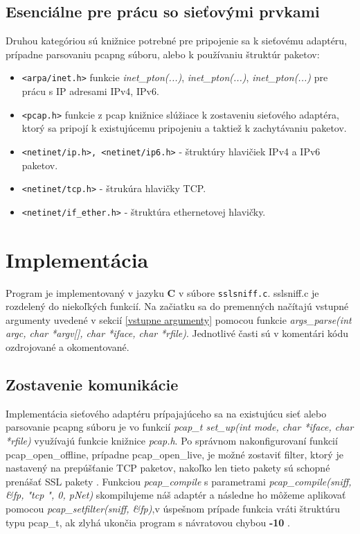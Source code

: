 \documentclass[11pt, a4paper]{article}
\begin{document}
	\subsection{Esenciálne pre prácu so sieťovými prvkami}
	Druhou kategóriou sú knižnice potrebné pre pripojenie sa k sieťovému adaptéru, prípadne parsovaniu pcapng súboru, alebo k používaniu štruktúr paketov:
	\begin{itemize}
	\item \texttt{<arpa/inet.h>} funkcie \emph{inet\_pton(...)}, \emph{inet\_pton(...)}, \emph{inet\_pton(...)} pre prácu s IP adresami IPv4, IPv6.
	\item \texttt{<pcap.h>} funkcie z pcap knižnice slúžiace k zostaveniu sieťového adaptéra, ktorý sa pripojí k existujúcemu pripojeniu a taktiež k zachytávaniu paketov.
	\item \texttt{<netinet/ip.h>, <netinet/ip6.h>} - štruktúry hlavičiek IPv4 a IPv6 paketov.
	\item \texttt{<netinet/tcp.h>} - štrukúra hlavičky TCP.
	\item \texttt{<netinet/if\_ether.h>} - štruktúra ethernetovej hlavičky.
	\end{itemize}

	
	
	\newpage
	\section{Implementácia}
	Program je implementovaný v jazyku \textbf{C} v súbore \texttt{sslsniff.c}.  
	sslsniff.c je rozdelený do niekoľkých funkcií. Na začiatku sa do premenných načítajú vstupné argumenty uvedené v sekcií \ref{vstupne argumenty} pomocou funkcie \emph{args\_parse(int argc, char *argv[], char *iface, char *rfile)}. 
Jednotlivé časti sú v komentári kódu ozdrojované a okomentované.
	
	\subsection{Zostavenie komunikácie}
	Implementácia sieťového adaptéru prípajajúceho sa na existujúcu sieť alebo parsovanie pcapng súboru je vo funkcií  \emph{pcap\_t set\_up(int mode, char *iface, char *rfile)} využívajú funkcie knižnice \emph{pcap.h}. Po správnom nakonfigurovaní funkcií pcap\_open\_offline, prípadne pcap\_open\_live, je možné zostaviť filter, ktorý je nastavený na prepúšťanie TCP paketov, nakoľko len tieto pakety sú schopné prenášať SSL pakety \cite{prednaskaZabezpeceni}. Funkciou \emph{pcap\_compile} s parametrami \emph{pcap\_compile(sniff, \&fp, "tcp ", 0, pNet)} skompilujeme náš adaptér a následne ho môžeme aplikovať pomocou \emph{pcap\_setfilter(sniff, \&fp)},v úspešnom prípade funkcia vráti štruktúru typu pcap\_t,  ak zlyhá ukončia program s návratovou chybou \textbf{-10} \cite{Tcpdump}. 
	
\end{document}

